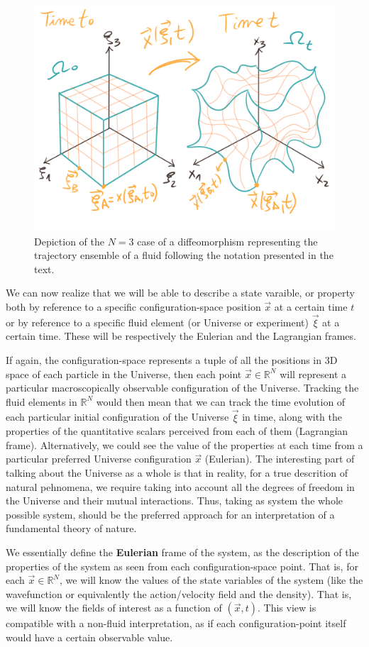 \documentclass[11pt, a4paper]{article} %
\newcommand{\R}{\mathbb{R}} %
\begin{document}
\begin{figure}[h!]
  \centering
    \includegraphics[width=0.65\linewidth]{1deforma.png}
  \caption{Depiction of the $N=3$ case of a diffeomorphism representing the trajectory ensemble of a fluid following the notation presented in the text. }
  \label{fig:deform}
\end{figure}

We can now realize that we will be able to describe a state varaible, or property both by reference to a specific configuration-space position $\vec{x}$ at a certain time $t$ or by reference to a specific fluid element (or Universe or experiment) $\vec{\xi}$ at a certain time. These will be respectively the Eulerian and the Lagrangian frames. 

If again, the configuration-space represents a tuple of all the positions in 3D space of each particle in the Universe, then each point $\vec{x}\in \R^N$ will represent a particular macroscopically observable configuration of the Universe. Tracking the fluid elements in $\R^N$ would then mean that we can track the time evolution of each particular initial configuration of the Universe $\vec{\xi}$ in time, along with the properties of the quantitative scalars perceived from each of them (Lagrangian frame). Alternatively, we could see the value of the properties at each time from a particular preferred Universe configuration $\vec{x}$ (Eulerian). The interesting part of talking about the Universe as a whole is that in reality, for a true descrition of natural pehnomena, we require taking into account all the degrees of freedom in the Universe and their mutual interactions. Thus, taking as system the whole possible system, should be the preferred approach for an interpretation of a fundamental theory of nature. 

We essentially define the {\bf Eulerian} frame of the system, as the description of the properties of the system as seen from each configuration-space point. That is, for each $\vec{x}\in\R^N$, we will know the values of the state variables of the system (like the wavefunction or equivalently the action/velocity field and the density). That is, we will know the fields of interest as a function of $(\vec{x},t)$. This view is compatible with a non-fluid interpretation, as if each configuration-point itself would have a certain observable value. 
\end{document}

